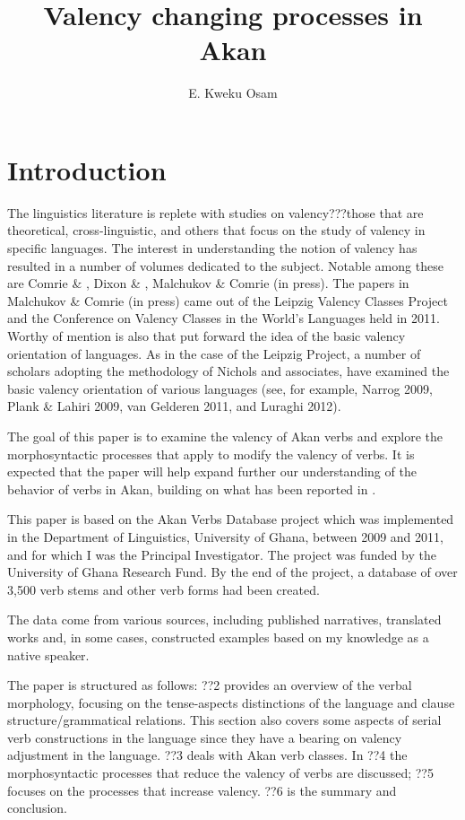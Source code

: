 \documentclass[output=paper]{langsci/langscibook}
\title{Valency changing processes in {Akan} }
\author{%
E. Kweku Osam\affiliation{University of Ghana} 
}
\begin{document}

\section{Introduction}

The linguistics literature is replete with studies on valency???those that are theoretical, cross-linguistic, and others that focus on the study of valency in specific languages. The interest in understanding the notion of valency has resulted in a number of volumes dedicated to the subject. Notable among these are Comrie \& \citet{Polinsky1993}, Dixon \& \citet{Aikhenvald2000a}, Malchukov \& Comrie (in press). The papers in Malchukov \& Comrie (in press) came out of the Leipzig Valency Classes Project and the Conference on Valency Classes in the World's Languages held in 2011. Worthy of mention is also \citet{NicholsEtAl2004} that put forward the idea of the basic valency orientation of languages. As in the case of the Leipzig Project, a number of scholars adopting the methodology of Nichols and associates, have examined the basic valency orientation of various languages (see, for example, Narrog 2009, Plank \& Lahiri 2009, van Gelderen 2011, and Luraghi 2012).  


The goal of this paper is to examine the valency of Akan verbs and explore the morphosyntactic processes that apply to modify the valency of verbs. It is expected that the paper will help expand further our understanding of the behavior of verbs in Akan, building on what has been reported in \citet{Osam2008a}. 

This paper is based on the Akan Verbs Database project which was implemented in the Department of Linguistics, University of Ghana, between 2009 and 2011, and for which I was the Principal Investigator. The project was funded by the University of Ghana Research Fund. By the end of the project, a database of over 3,500 verb stems and other verb forms had been created.

The data come from various sources, including published narratives, translated works and, in some cases, constructed examples based on my knowledge as a native speaker.

The paper is structured as follows: ??2 provides an overview of the verbal morphology, focusing on the tense-aspects distinctions of the language and clause structure/grammatical relations. This section also covers some aspects of serial verb constructions in the language since they have a bearing on valency adjustment in the language. ??3 deals with Akan verb classes. In ??4 the morphosyntactic processes that reduce the valency of verbs are discussed; ??5 focuses on the processes that increase valency. ??6 is the summary and conclusion.
\end{document}
